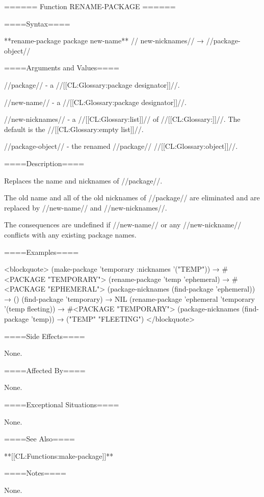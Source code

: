 ====== Function RENAME-PACKAGE ======

====Syntax====

**rename-package {package new-name** //\opt} new-nicknames// → //package-object//

====Arguments and Values====

//package// - a //[[CL:Glossary:package designator]]//.

//new-name// - a //[[CL:Glossary:package designator]]//.

//new-nicknames// - a //[[CL:Glossary:list]]// of //[[CL:Glossary:\packagenamedesignators]]//. The default is the //[[CL:Glossary:empty list]]//.

//package-object// - the renamed //package// //[[CL:Glossary:object]]//.

====Description====

Replaces the name and nicknames of //package//.

The old name and all of the old nicknames of //package// are eliminated and are replaced by //new-name// and //new-nicknames//.

The consequences are undefined if //new-name// or any //new-nickname// conflicts with any existing package names.

====Examples====

<blockquote> (make-package 'temporary :nicknames '("TEMP")) → #<PACKAGE "TEMPORARY"> (rename-package 'temp 'ephemeral) → #<PACKAGE "EPHEMERAL"> (package-nicknames (find-package 'ephemeral)) → () (find-package 'temporary) → NIL (rename-package 'ephemeral 'temporary '(temp fleeting)) → #<PACKAGE "TEMPORARY"> (package-nicknames (find-package 'temp)) → ("TEMP" "FLEETING") </blockquote>

====Side Effects====

None.

====Affected By====

None.

====Exceptional Situations====

None.

====See Also====

**[[CL:Functions:make-package]]**

====Notes====

None.

 

